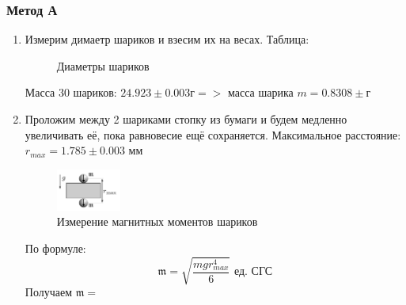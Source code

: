 \documentclass[11pt,a4paper]{article}
\newcommand{\mk}{\mathfrak}
\begin{document}
\subsubsection{Метод А}
\begin{enumerate}
  \item Измерим димаетр шариков и взесим их на весах. Таблица:
  \begin{figure}[H]
    \label{tab:diametrs}
    \caption{Диаметры шариков}
  \end{figure}
  Масса 30 шариков: $24.923 \pm 0.003 \text{г} => $ масса шарика $m=0.8308 \pm\text{г}$
  \item Проложим между 2 шариками стопку из бумаги и будем медленно увеличивать её, пока равновесие ещё сохраняется. Максимальное расстояние: $r_{max} = 1.785 \pm 0.003$ мм
  \begin{figure}[H]
    \includegraphics*[width=0.2\textwidth]{2023-10-01-23-50-52.png}
    \caption{Измерение магнитных моментов шариков}
    \label{ust:met_a}
  \end{figure}
  По формуле:
  $$\mathfrak{m}=\sqrt{\frac{mgr^4_{max}}{6}} \text{ ед. СГС}$$
  Получаем $\mk m = $
\end{enumerate}
\end{document}
